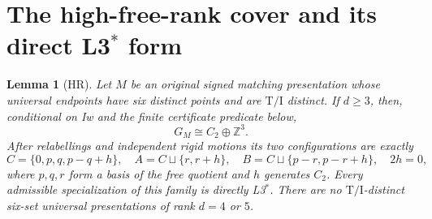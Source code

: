 \documentclass[11pt]{article}
\newtheorem{lemma}[theorem]{Lemma}
\theoremstyle{remark}
\newcommand{\Z}{\mathbb Z}
\newcommand{\TI}{\mathrm{T/I}}
\begin{document}
\section{The high-free-rank cover and its direct \texorpdfstring{L3$^*$}{L3*} form}
\label{sec:formal-high-rank}
\begin{lemma}[HR]\label{lem:hr}
Let $M$ be an original signed matching presentation whose universal
endpoints have six distinct points and are $\TI$ distinct. If $d\ge3$,
then, conditional on Iw and the finite certificate predicate below,
\[
 G_M\cong C_2\oplus\Z^3.
\]
After relabellings and independent rigid motions its two configurations
are exactly
\begin{equation}\label{eq:hr-master}
 C=\{0,p,q,p-q+h\},\quad
 A=C\sqcup\{r,r+h\},\quad
 B=C\sqcup\{p-r,p-r+h\},\quad2h=0,
\end{equation}
where $p,q,r$ form a basis of the free quotient and $h$ generates $C_2$.
Every admissible specialization of this family is directly L3$^*$.
There are no $\TI$-distinct six-set universal presentations of rank
$d=4$ or $5$.
\end{lemma}
\end{document}
